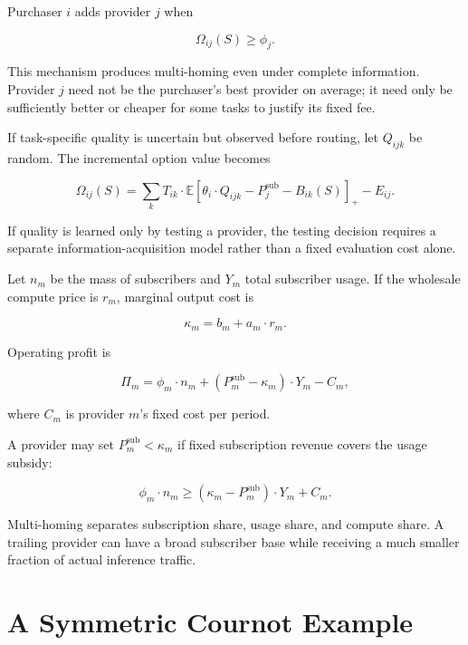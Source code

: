 \documentclass[11pt]{article}
\begin{document}
Purchaser $i$ adds provider $j$ when

\begin{equation}\Omega_{ij}(S)\geq\phi_j.\end{equation}

This mechanism produces multi-homing even under complete information. Provider $j$ need not be the purchaser's best provider on average; it need only be sufficiently better or cheaper for some tasks to justify its fixed fee.

If task-specific quality is uncertain but observed before routing, let $Q_{ijk}$ be random. The incremental option value becomes

\begin{equation}\Omega_{ij}(S)=\sum_k T_{ik}\cdot\mathbb E\left[\theta_i\cdot Q_{ijk}-P_j^{\mathrm{sub}}-B_{ik}(S)\right]_+-E_{ij}.\end{equation}

If quality is learned only by testing a provider, the testing decision requires a separate information-acquisition model rather than a fixed evaluation cost alone.

Let $n_m$ be the mass of subscribers and $Y_m$ total subscriber usage. If the wholesale compute price is $r_m$, marginal output cost is

\begin{equation}\kappa_m=b_m+a_m\cdot r_m.\end{equation}

Operating profit is

\begin{equation}\Pi_m=\phi_m\cdot n_m+\left(P_m^{\mathrm{sub}}-\kappa_m\right)\cdot Y_m-C_m,\end{equation}

where $C_m$ is provider $m$'s fixed cost per period.

A provider may set $P_m^{\mathrm{sub}}<\kappa_m$ if fixed subscription revenue covers the usage subsidy:

\begin{equation}\phi_m\cdot n_m\geq\left(\kappa_m-P_m^{\mathrm{sub}}\right)\cdot Y_m+C_m.\end{equation}

Multi-homing separates subscription share, usage share, and compute share. A trailing provider can have a broad subscriber base while receiving a much smaller fraction of actual inference traffic.

\section{A Symmetric Cournot Example}
\label{app:cournot}
\end{document}
